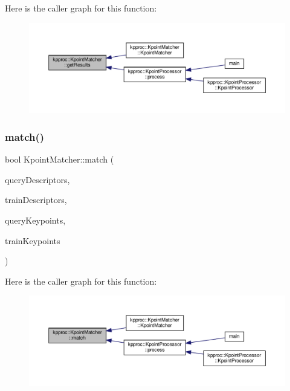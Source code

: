 Here is the caller graph for this function\+:\nopagebreak
\begin{figure}[H]
\begin{center}
\leavevmode
\includegraphics[width=350pt]{classkpproc_1_1KpointMatcher_a02f6944a8401a2a14bb5ce42073389b0_icgraph}
\end{center}
\end{figure}
\mbox{\label{classkpproc_1_1KpointMatcher_a21caea2a00576784b2fc90dd652870ed}} 
\subsubsection{\texorpdfstring{match()}{match()}}
{\footnotesize\ttfamily bool Kpoint\+Matcher\+::match (\begin{DoxyParamCaption}\item[{const cv\+::\+Mat \&}]{query\+Descriptors,  }\item[{const cv\+::\+Mat \&}]{train\+Descriptors,  }\item[{const std\+::vector$<$ cv\+::\+Key\+Point $>$ \&}]{query\+Keypoints,  }\item[{const std\+::vector$<$ cv\+::\+Key\+Point $>$ \&}]{train\+Keypoints }\end{DoxyParamCaption})}

Here is the caller graph for this function\+:\nopagebreak
\begin{figure}[H]
\begin{center}
\leavevmode
\includegraphics[width=350pt]{classkpproc_1_1KpointMatcher_a21caea2a00576784b2fc90dd652870ed_icgraph}
\end{center}
\end{figure}
\mbox{\label{classkpproc_1_1KpointMatcher_a0d1681f55cfeea8a51bba9ccac41d346}} 
